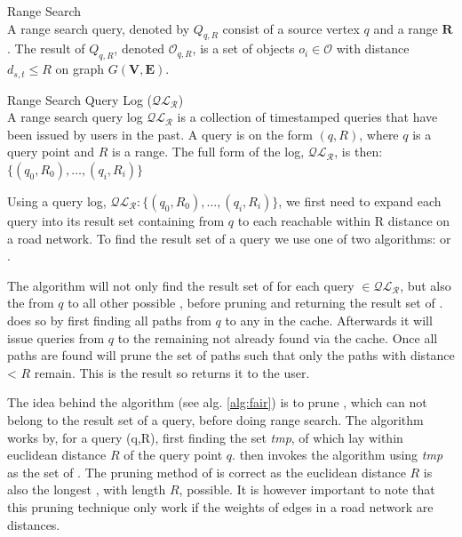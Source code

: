 \begin{definition}{Range Search}\\
A range search query, denoted by $Q_{q,R}$ consist of a source vertex $q$ and a range $\mathbf{R}$.
The result of $Q_{q,R}$, denoted $\mathcal{O}_{q,R}$, is a set of objects $o_i \in \mathcal{O}$ with \spath distance $d_{s,t} \leq R$ on graph $G\mathbf{(V,E)}$.
\end{definition}


\begin{definition}{Range Search Query Log ($\mathcal{QL_R}$)}\\
A range search query log $\mathcal{QL_R}$ is a collection of timestamped queries that have been issued by users in the past.
A query is on the form $(q,R)$, where $q$ is a query point and $R$ is a range. The full form of the log, $\mathcal{QL_R}$,  is then: $\{(q_0,R_0),\dots,(q_i,R_i)\}$
\end{definition}


Using a query log, $\mathcal{QL_R}: \{(q_0,R_0),\dots,(q_i,R_i)\}$, we first need to expand each query into its \spath result set containing \spaths from $q$ to each \poi reachable within R distance on a road network. 
To find the result set of a query we use one of two algorithms: \naive or \fairns.

The \naive algorithm will not only find the result set of \spath for each query $\in \mathcal{QL_R}$, but also the \spath from $q$ to all other possible \poins, before pruning and returning the result set of \poisns.
\naive does so by first finding all paths from $q$ to any \poi in the cache. Afterwards it will issue \spath queries from $q$ to the remaining \pois not already found via the cache. 
Once all paths are found \naive will prune the set of paths such that only the paths with distance < $R$ remain. This is the result so \naive returns it to the user.

The idea behind the \fair algorithm (see alg. \ref{alg:fair}) is to prune \poisns, which can not belong to the result set of a query, before doing range search. The \fair algorithm works by, for a query (q,R), first finding the set {\it tmp\poins}, of \pois which lay within euclidean distance $R$ of the query point $q$. \fair then invokes the \naive algorithm using {\it tmp\poins} as the set of \poins.
The pruning method of \fair is correct as the euclidean distance $R$ is also the longest \spathns, with length $R$, possible. It is however important to note that this pruning technique only work if the weights of edges in a road network are distances.


